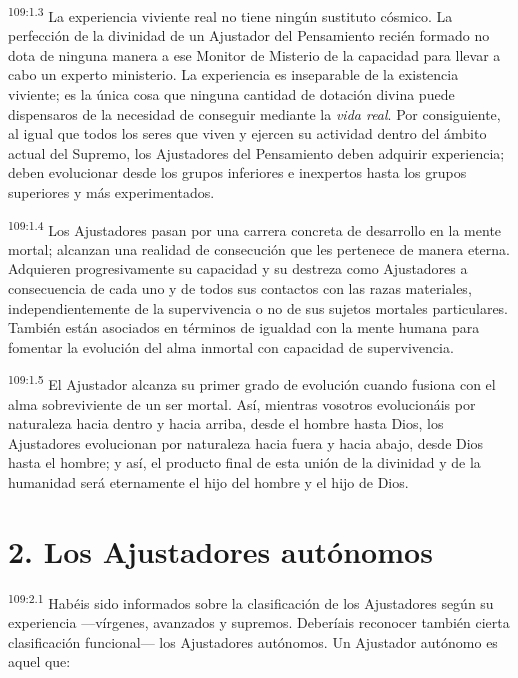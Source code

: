 \par
\textsuperscript{109:1.3} La experiencia viviente real no tiene ningún sustituto cósmico. La perfección de la divinidad de un Ajustador del Pensamiento recién formado no dota de ninguna manera a ese Monitor de Misterio de la capacidad para llevar a cabo un experto ministerio. La experiencia es inseparable de la existencia viviente; es la única cosa que ninguna cantidad de dotación divina puede dispensaros de la necesidad de conseguir mediante la \textit{vida real}. Por consiguiente, al igual que todos los seres que viven y ejercen su actividad dentro del ámbito actual del Supremo, los Ajustadores del Pensamiento deben adquirir experiencia; deben evolucionar desde los grupos inferiores e inexpertos hasta los grupos superiores y más experimentados.

\par
\textsuperscript{109:1.4} Los Ajustadores pasan por una carrera concreta de desarrollo en la mente mortal; alcanzan una realidad de consecución que les pertenece de manera eterna. Adquieren progresivamente su capacidad y su destreza como Ajustadores a consecuencia de cada uno y de todos sus contactos con las razas materiales, independientemente de la supervivencia o no de sus sujetos mortales particulares. También están asociados en términos de igualdad con la mente humana para fomentar la evolución del alma inmortal con capacidad de supervivencia.

\par
\textsuperscript{109:1.5} El Ajustador alcanza su primer grado de evolución cuando fusiona con el alma sobreviviente de un ser mortal. Así, mientras vosotros evolucionáis por naturaleza hacia dentro y hacia arriba, desde el hombre hasta Dios, los Ajustadores evolucionan por naturaleza hacia fuera y hacia abajo, desde Dios hasta el hombre; y así, el producto final de esta unión de la divinidad y de la humanidad será eternamente el hijo del hombre y el hijo de Dios.

\section*{2. Los Ajustadores autónomos}
\par
\textsuperscript{109:2.1} Habéis sido informados sobre la clasificación de los Ajustadores según su experiencia ---vírgenes, avanzados y supremos. Deberíais reconocer también cierta clasificación funcional--- los Ajustadores autónomos. Un Ajustador autónomo es aquel que:


